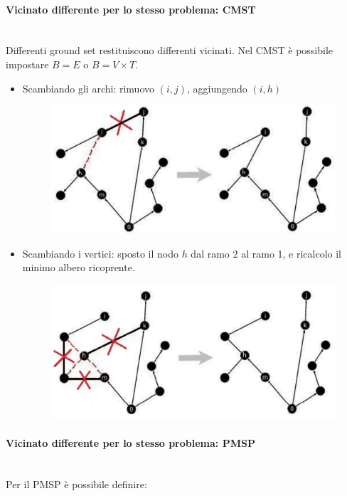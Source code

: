 \documentclass{article}
\begin{document}
\paragraph{Vicinato differente per lo stesso problema: CMST}\mbox{}\\
Differenti ground set restituiscono differenti vicinati. Nel CMST è possibile impostare
$B=E$ o $B=V\times T$.
\begin{itemize}
    \item Scambiando gli archi: rimuovo $(i,j)$, aggiungendo $(i,h)$
          \begin{figure}[H]
              \centering
              \includegraphics[scale=0.5]{images/rem_neigh.png}
          \end{figure}
    \item Scambiando i vertici: sposto il nodo $h$ dal ramo 2 al ramo 1, e ricalcolo il
          minimo albero ricoprente.
          \begin{figure}[H]
              \centering
              \includegraphics[scale=0.5]{images/move_h_other_branch.png}
          \end{figure}
\end{itemize}

\paragraph{Vicinato differente per lo stesso problema: PMSP}\mbox{}\\
Per il PMSP è possibile definire:
\end{document}
